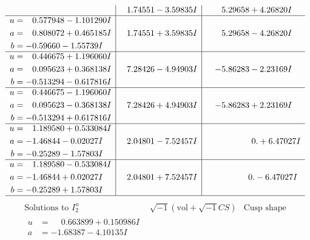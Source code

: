 \documentclass[1p]{elsarticle_modified}
\theoremstyle{definition}
\newcommand{\I}{\sqrt{-1}}
\begin{document}
$$\begin{array}{c|c|c}
 & \phantom{-}1.74551 - 3.59835 I & \phantom{-}5.29658 + 4.26820 I \\ \hline\begin{aligned}
u &= \phantom{-}0.577948 - 1.101290 I \\
a &= \phantom{-}0.808072 + 0.465185 I \\
b &= -0.59660 - 1.55739 I\end{aligned}
 & \phantom{-}1.74551 + 3.59835 I & \phantom{-}5.29658 - 4.26820 I \\ \hline\begin{aligned}
u &= \phantom{-}0.446675 + 1.196060 I \\
a &= \phantom{-}0.095623 + 0.368138 I \\
b &= -0.513294 - 0.617816 I\end{aligned}
 & \phantom{-}7.28426 - 4.94903 I & -5.86283 - 2.23169 I \\ \hline\begin{aligned}
u &= \phantom{-}0.446675 - 1.196060 I \\
a &= \phantom{-}0.095623 - 0.368138 I \\
b &= -0.513294 + 0.617816 I\end{aligned}
 & \phantom{-}7.28426 + 4.94903 I & -5.86283 + 2.23169 I \\ \hline\begin{aligned}
u &= \phantom{-}1.189580 + 0.533084 I \\
a &= -1.46844 - 0.02027 I \\
b &= -0.25289 - 1.57803 I\end{aligned}
 & \phantom{-}2.04801 - 7.52457 I & \phantom{-0.000000 -}0. + 6.47027 I \\ \hline\begin{aligned}
u &= \phantom{-}1.189580 - 0.533084 I \\
a &= -1.46844 + 0.02027 I \\
b &= -0.25289 + 1.57803 I\end{aligned}
 & \phantom{-}2.04801 + 7.52457 I & \phantom{-0.000000 } 0. - 6.47027 I\\
 \hline 
 \end{array}$$\newpage$$\begin{array}{c|c|c}  
\text{Solutions to }I^u_{2}& \I (\text{vol} + \sqrt{-1}CS) & \text{Cusp shape}\\
 \hline 
\begin{aligned}
u &= \phantom{-}0.663899 + 0.150986 I \\
a &= -1.68387 - 4.10135 I \\

\end{aligned}
\end{array}$$
\end{document}
